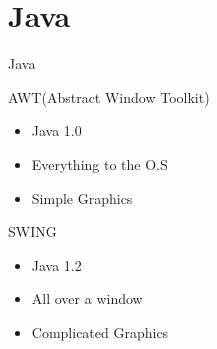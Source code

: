 \documentclass[11pt]{beamer}
\begin{document}
	\section{Java}
	\begin{frame}{Java}
		\begin{block}{AWT(Abstract Window Toolkit)}
			\begin{itemize}
			\item Java 1.0
			\item Everything to the O.S
			\item Simple Graphics
			\end{itemize}
		\end{block}
		\begin{block}{SWING}
			\begin{itemize}
			\item Java 1.2
			\item All over a window
			\item Complicated Graphics
			\end{itemize}
		\end{block}
	\end{frame}
	
\end{document}
